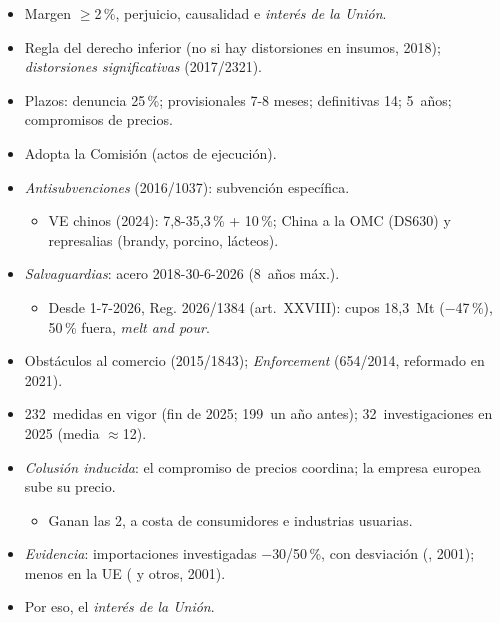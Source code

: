 \documentclass{article}
\begin{document}
\begin{columnas}
\begin{itemize}
\item Margen $\geq$2\,\%, perjuicio, causalidad e \emph{interés de la Unión}.
\item Regla del derecho inferior (no si hay distorsiones en insumos, 2018); \emph{distorsiones significativas} (2017/2321).
\item Plazos: denuncia 25\,\%; provisionales 7-8 meses; definitivas 14; 5~años; compromisos de precios.
\item Adopta la Comisión (actos de ejecución).
\end{itemize}
\begin{itemize}
\item \emph{Antisubvenciones} (2016/1037): subvención específica.
  \begin{itemize}
  \item VE chinos (2024): 7,8-35,3\,\% + 10\,\%; China a la OMC (DS630) y represalias (brandy, porcino, lácteos).
  \end{itemize}
\item \emph{Salvaguardias}: acero 2018-30-6-2026 (8~años máx.).
  \begin{itemize}
  \item Desde 1-7-2026, Reg. 2026/1384 (art.~XXVIII): cupos 18,3~Mt ($-$47\,\%), 50\,\% fuera, \emph{melt and pour}.
  \end{itemize}
\item Obstáculos al comercio (2015/1843); \emph{Enforcement} (654/2014, reformado en 2021).
\end{itemize}
\begin{itemize}
\item 232~medidas en vigor (fin de 2025; 199~un año antes); 32~investigaciones en 2025 (media $\approx$12).
\end{itemize}
\begin{itemize}
\item \emph{Colusión inducida}: el compromiso de precios coordina; la empresa europea sube su precio.
  \begin{itemize}
  \item Ganan las 2, a costa de consumidores e industrias usuarias.
  \end{itemize}
\item \emph{Evidencia}: importaciones investigadas $-$30/50\,\%, con desviación (, 2001); menos en la UE ( y otros, 2001).
\item Por eso, el \emph{interés de la Unión}.
\end{itemize}


\end{columnas}
\end{document}
